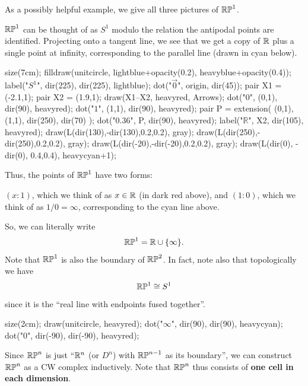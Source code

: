 As a possibly helpful example, we give all three pictures of $\mathbb{RP}^1$.
\begin{example}
	$\mathbb{RP}^1$ can be thought of as $S^1$ modulo the relation
	the antipodal points are identified.
	Projecting onto a tangent line, we see that we get
	a copy of $\mathbb R$ plus a single point at infinity, corresponding
	to the parallel line (drawn in cyan below).
	\begin{center}
		\begin{asy}
			size(7cm);
			filldraw(unitcircle, lightblue+opacity(0.2), heavyblue+opacity(0.4));
			label("$S^1$", dir(225), dir(225), lightblue);
			dot("$\vec 0$", origin, dir(45));
			pair X1 = (-2.1,1);
			pair X2 = (1.9,1);
			draw(X1--X2, heavyred, Arrows);
			dot("$0$", (0,1), dir(90), heavyred);
			dot("$1$", (1,1), dir(90), heavyred);
			pair P = extension( (0,1), (1,1), dir(250), dir(70) );
			dot("$0.36$", P, dir(90), heavyred);
			label("$\mathbb R$", X2, dir(105), heavyred);
			draw(L(dir(130),-dir(130),0.2,0.2), gray);
			draw(L(dir(250),-dir(250),0.2,0.2), gray);
			draw(L(dir(-20),-dir(-20),0.2,0.2), gray);
			draw(L(dir(0), -dir(0), 0.4,0.4), heavycyan+1);
		\end{asy}
	\end{center}

	Thus, the points of $\mathbb{RP}^1$ have two forms:
	\begin{itemize}
		\ii $(x:1)$, which we think of as $x \in \mathbb R$ (in dark red above), and
		\ii $(1:0)$, which we think of as $1/0 = \infty$,
		corresponding to the cyan line above.
	\end{itemize}
	So, we can literally write
	\[ \mathbb{RP}^1 = \mathbb R \cup \{\infty\}. \]
	Note that $\mathbb{RP}^1$ is also the boundary of $\mathbb{RP}^2$.
	In fact, note also that topologically we have
	\[ \mathbb{RP}^1 \cong S^1 \]
	since it is the ``real line with endpoints fused together''.
	\begin{center}
		\begin{asy}
			size(2cm);
			draw(unitcircle, heavyred);
			dot("$\infty$", dir(90), dir(90), heavycyan);
			dot("$0$", dir(-90), dir(-90), heavyred);
		\end{asy}
	\end{center}
\end{example}

Since $\mathbb{RP}^n$ is just ``$\mathbb R^n$ (or $D^n$) with $\mathbb{RP}^{n-1}$ as its boundary'',
we can construct $\mathbb{RP}^n$ as a CW complex inductively.
Note that $\mathbb{RP}^n$ thus consists of \textbf{one cell in each dimension}.

